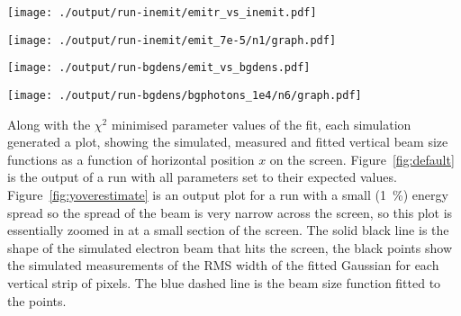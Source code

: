 \begin{figure*}[!tb]
	\begin{minipage}[t]{\columnwidth}
		\centering
		\texttt{[image: ./output/run-inemit/emitr\_vs\_inemit.pdf]}
		\caption{
			Plot of the ratio between the measured and true emittances of the beam
			against the true emittance of the beam.
			The blue line is the expected measurement value when taking into account
			the systematic overestimation due to discrete bins.
		}
		\label{fig:emitr_inemit}
	\end{minipage}\hfill
	\begin{minipage}[t]{\columnwidth}
		\centering
		\texttt{[image: ./output/run-inemit/emit\_7e-5/n1/graph.pdf]}
		\caption{
			Beam reconstruction for a large beam emittance of
			\SI{7e-5}{\meter\radian} showing the underestimation of the measured
			vertical beam sizes.
		}
		\label{fig:large_emit}
	\end{minipage}
\end{figure*}

\begin{figure*}[!tb]
	\begin{minipage}[t]{\columnwidth}
		\centering
		\texttt{[image: ./output/run-bgdens/emit\_vs\_bgdens.pdf]}
		\caption{
			Plot of the measured beam emittance against a factor of the expected
			background density of \SI{3.415e4}{photons\per\meter\squared}
		}
		\label{fig:emit_bgdens}
	\end{minipage}\hfill
	\begin{minipage}[t]{\columnwidth}
		\centering
		\texttt{[image: ./output/run-bgdens/bgphotons\_1e4/n6/graph.pdf]}
		\caption{
			Beam reconstruction for a background \num{1e4} times the expected
			background photon density.
		}
		\label{fig:large_bg}
	\end{minipage}
\end{figure*}

Along with the \(\chi^2\) minimised parameter values of the fit, each simulation
generated a plot, showing the simulated, measured and fitted vertical beam size
functions as a function of horizontal position \(x\) on the screen.
Figure~\ref{fig:default} is the output of a run with all parameters set to their
expected values.  Figure~\ref{fig:yoverestimate} is an output plot for a run
with a small (\SI{1}{\percent}) energy spread so the spread of the beam is very
narrow across the screen, so this plot is essentially zoomed in at a small
section of the screen. The solid black line is the shape of the simulated
electron beam that hits the screen, the black points show the simulated
measurements of the RMS width of the fitted Gaussian for each vertical strip of
pixels. The blue dashed line is the beam size function fitted to the points.

